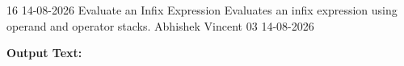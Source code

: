 \clearpage
\label{prog:16}
\programhead
  {16}
  {14-08-2026}
  {Evaluate an Infix Expression}
  {Evaluates an infix expression using operand and operator stacks.}
  {Abhishek Vincent}
  {03}
  {14-08-2026}

\divider
\textbf{Output Text:}\par
\vspace{2pt}

